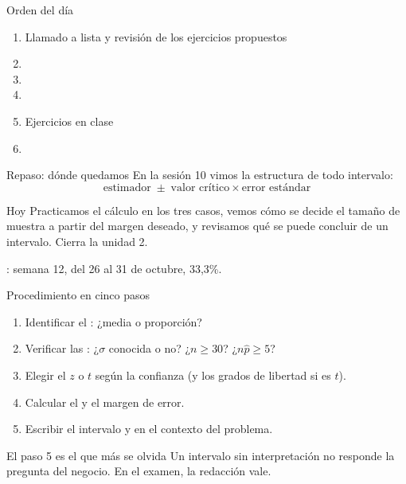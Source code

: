 \documentclass[aspectratio=169,10pt]{beamer}
\begin{document}
\portada

\begin{frame}{Orden del día}
  \begin{enumerate}
    \item Llamado a lista y revisión de los ejercicios propuestos
    \item {}
    \item {}
    \item {}
    \item Ejercicios en clase
    \item {}
  \end{enumerate}
\end{frame}

\begin{frame}{Repaso: dónde quedamos}
  En la sesión 10 vimos la estructura de todo intervalo:
  \[ \text{estimador} \;\pm\; \text{valor crítico}\times\text{error estándar} \]

  \vspace{0.2cm}
  \begin{alertblock}{Hoy}
    \footnotesize
    Practicamos el cálculo en los tres casos, vemos cómo se decide el tamaño de
    muestra a partir del margen deseado, y revisamos qué  se puede
    concluir de un intervalo. Cierra la unidad 2.
  \end{alertblock}

  \vspace{0.15cm}
  {\footnotesize\color{uniGris} : semana 12, del 26 al 31 de
  octubre, 33,3\%.}
\end{frame}


\begin{frame}{Procedimiento en cinco pasos}
  \small
  \begin{enumerate}
    \item Identificar el : ¿media o proporción?
    \item Verificar las : ¿$\sigma$ conocida o no? ¿$n\ge 30$?
          ¿$n\hat p\ge 5$?
    \item Elegir el  $z$ o $t$ según la confianza (y los
          grados de libertad si es $t$).
    \item Calcular el  y el margen de error.
    \item Escribir el intervalo y  en el
          contexto del problema.
  \end{enumerate}

  \vspace{0.25cm}
  \begin{alertblock}{El paso 5 es el que más se olvida}
    \footnotesize
    Un intervalo sin interpretación no responde la pregunta del negocio. En el
    examen, la redacción vale.
  \end{alertblock}
\end{frame}
\end{document}

